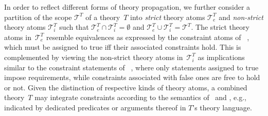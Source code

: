 In order to reflect different forms of theory propagation,
we further consider a partition of the scope $\mathcal{T}^T$ of a theory~$T$ into %
\emph{strict} theory atoms $\mathcal{T}^T_e$ and
\emph{non-strict} theory atoms $\mathcal{T}^T_i$
such that
$\mathcal{T}^T_e\cap\mathcal{T}^T_i=\emptyset$ and
$\mathcal{T}^T_e\cup\mathcal{T}^T_i=\mathcal{T}^T$.
The strict theory atoms in~$\mathcal{T}^T_e$ resemble equivalences as expressed by the constraint atoms
of \clingcon\ \cite{ostsch12a}, which must be assigned to true iff their associated
constraints hold.
This is complemented by viewing the non-strict theory atoms in~$\mathcal{T}^T_i$ as
implications similar to the constraint statements of \ezcsp\ \cite{balduccini09a},
where only statements assigned to true impose requirements, while constraints associated with
false ones are free to hold or not.
Given the distinction of respective kinds of theory atoms,
a combined theory~$T$ may integrate constraints according to the semantics of \clingcon\ and \ezcsp,
e.g., indicated by dedicated predicates or arguments thereof in $T$'s theory language.

